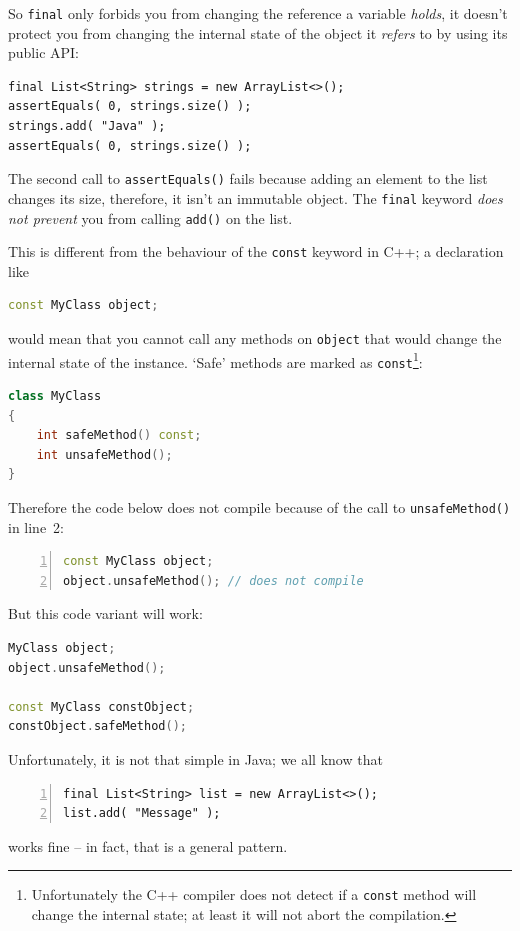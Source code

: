 \documentclass[11pt,a4paper, titlepage, parskip=half, headsepline, footsepline, cleardoublepage=current, headheight=1cm]{scrbook}
\begin{document}
So \lstinline|final| only forbids you from changing the reference a variable \textit{holds}, it doesn't protect you from changing the internal state of the object it \textit{refers} to by using its public API:
\begin{lstlisting}
final List<String> strings = new ArrayList<>();
assertEquals( 0, strings.size() );
strings.add( "Java" );
assertEquals( 0, strings.size() );
\end{lstlisting}
The second call to \lstinline|assertEquals()| fails because adding an element to the list changes its size, therefore, it isn't an immutable object. The \lstinline|final| keyword \textit{does not prevent} you from calling \lstinline|add()| on the list.

This is different from the behaviour of the \lstinline|const| keyword in C++; a declaration like
\begin{lstlisting}[language=C++]
const MyClass object;
\end{lstlisting}
would mean that you cannot call any methods on \lstinline|object| that would change the internal state of the instance. ‘Safe’ methods are marked as \lstinline|const|\footnote{Unfortunately the C++ compiler does not detect if a \lstinline|const| method will change the internal state; at least it will not abort the compilation.}:
\begin{lstlisting}[language=C++]
class MyClass
{
    int safeMethod() const;
    int unsafeMethod();
}
\end{lstlisting}

Therefore the code below does not compile because of the call to \lstinline|unsafeMethod()| in line~2:
\begin{lstlisting}[numbers=left,language=C++]
const MyClass object;
object.unsafeMethod(); // does not compile
\end{lstlisting}
But this code variant will work:
\begin{lstlisting}[language=C++]
MyClass object;
object.unsafeMethod();

const MyClass constObject;
constObject.safeMethod();
\end{lstlisting}

Unfortunately, it is not that simple in Java; we all know that
\begin{lstlisting}[numbers=left]
final List<String> list = new ArrayList<>();
list.add( "Message" );
\end{lstlisting}
works fine – in fact, that is a general pattern.
\end{document}
